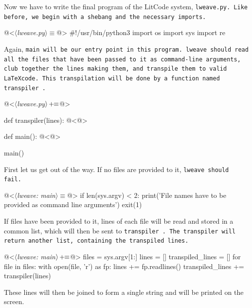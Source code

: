 Now we have to write the final program of the LitCode system, \tt lweave.py\rm. Like before, we begin with a
shebang and the necessary imports.

\begin{code}[lweave.py]
@<$\langle$\textit{lweave.py}$\rangle\equiv$@>
#!/usr/bin/python3
import os
import sys
import re

\end{code}

Again, \tt main \rm will be our entry point in this program. \tt lweave \rm should read all the files that
have been passed to it as command-line arguments, club together the lines making them, and transpile them to
valid \LaTeX code. This transpilation will be done by a function named \tt transpiler \rm.

\begin{oldcode}
@<$\langle$\textit{lweave.py}$\rangle \thinspace +\!\!\equiv$@>

def transpiler(lines):
    @<@>

def main():
    @<@>

main()
\end{oldcode}

First let us get  out of the way. If no files are provided to it, \tt lweave \rm should fail.

\begin{code}
@<$\langle$\textit{lweave: main}$\rangle\equiv$@>
if len(sys.argv) < 2:
    print('File names have to be provided as command line arguments')
    exit(1)

\end{code}

If files have been provided to it, lines of each file will be read and stored in a common list, which will
then be sent to \tt transpiler \rm. The transpiler will return another list, containing the transpiled lines.

\begin{oldcode}
@<$\langle$\textit{lweave: main}$\rangle \thinspace +\!\!\equiv$@>
files = sys.argv[1:]
lines = []
transpiled_lines = []
for file in files:
    with open(file, 'r') as fp:
        lines += fp.readlines()
transpiled_lines += transpiler(lines)

\end{oldcode}

These lines will then be joined to form a single string and will be printed on the screen.


